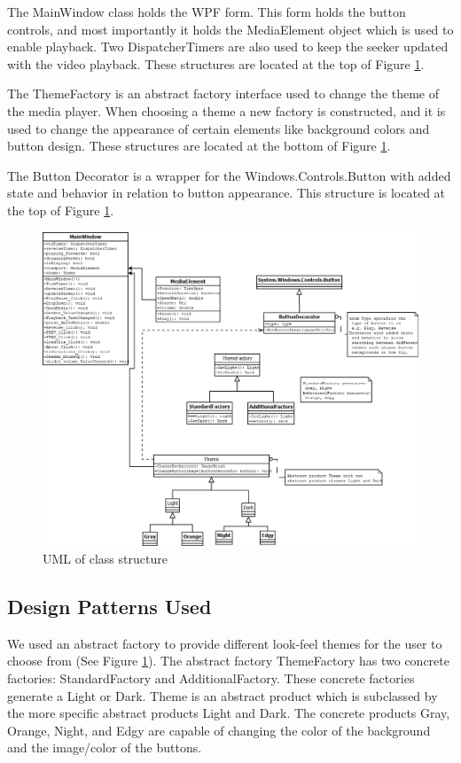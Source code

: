 \documentclass[10pt,conference,onecolumn,compsoc]{IEEEtran}
\begin{document}
The MainWindow class holds the WPF form. This form holds the button controls, and most importantly it holds the MediaElement object which is used to enable playback. Two DispatcherTimers are also used to keep the seeker updated with the video playback. These structures are located at the top of Figure \ref{UML}.\par
The ThemeFactory is an abstract factory interface used to change the theme of the media player. When choosing a theme a new factory is constructed, and it is used to change the appearance of certain elements like background colors and button design. These structures are located at the bottom of Figure \ref{UML}.\par
The Button Decorator is a wrapper for the Windows.Controls.Button with added state and behavior in relation to button appearance. This structure is located at the top of Figure \ref{UML}.
\begin{figure}[H]
\begin{center}
\includegraphics[scale=0.4]{MediaPlayerUML.png}
\caption{UML of class structure}
\label{UML}
\end{center}
\end{figure}


\subsection{Design Patterns Used}
We used an abstract factory to provide different look-feel themes for the user to choose from (See Figure \ref{UML}). The abstract factory ThemeFactory has two concrete factories: StandardFactory and AdditionalFactory. These concrete factories generate a Light or Dark. Theme is an abstract product which is subclassed by the more specific abstract products Light and Dark. The concrete products Gray, Orange, Night, and Edgy are capable of changing the color of the background and the image/color of the buttons. \medskip
\end{document}
